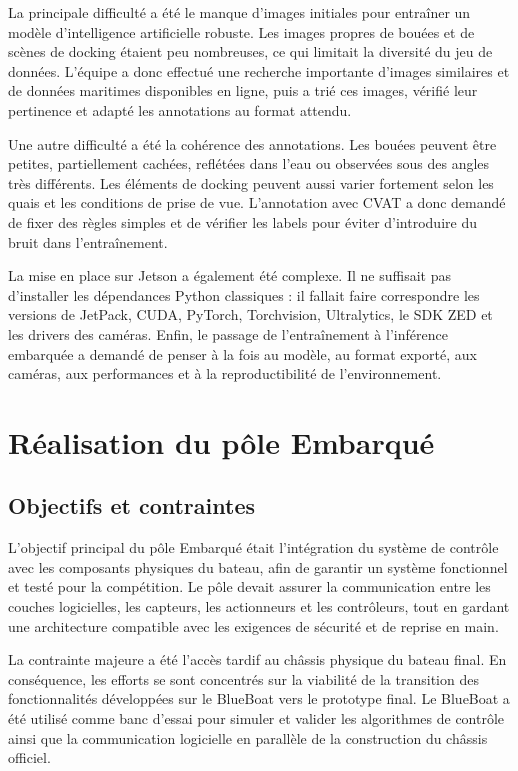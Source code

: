 \documentclass[11pt,letterpaper]{article}
\begin{document}
La principale difficulté a été le manque d'images initiales pour entraîner un modèle d'intelligence artificielle robuste. Les images propres de bouées et de scènes de docking étaient peu nombreuses, ce qui limitait la diversité du jeu de données. L'équipe a donc effectué une recherche importante d'images similaires et de données maritimes disponibles en ligne, puis a trié ces images, vérifié leur pertinence et adapté les annotations au format attendu.

Une autre difficulté a été la cohérence des annotations. Les bouées peuvent être petites, partiellement cachées, reflétées dans l'eau ou observées sous des angles très différents. Les éléments de docking peuvent aussi varier fortement selon les quais et les conditions de prise de vue. L'annotation avec CVAT a donc demandé de fixer des règles simples et de vérifier les labels pour éviter d'introduire du bruit dans l'entraînement.

La mise en place sur Jetson a également été complexe. Il ne suffisait pas d'installer les dépendances Python classiques : il fallait faire correspondre les versions de JetPack, CUDA, PyTorch, Torchvision, Ultralytics, le SDK ZED et les drivers des caméras. Enfin, le passage de l'entraînement à l'inférence embarquée a demandé de penser à la fois au modèle, au format exporté, aux caméras, aux performances et à la reproductibilité de l'environnement.

\section{Réalisation du pôle Embarqué}

\subsection{Objectifs et contraintes}

L'objectif principal du pôle Embarqué était l'intégration du système de contrôle avec les composants physiques du bateau, afin de garantir un système fonctionnel et testé pour la compétition. Le pôle devait assurer la communication entre les couches logicielles, les capteurs, les actionneurs et les contrôleurs, tout en gardant une architecture compatible avec les exigences de sécurité et de reprise en main.

La contrainte majeure a été l'accès tardif au châssis physique du bateau final. En conséquence, les efforts se sont concentrés sur la viabilité de la transition des fonctionnalités développées sur le BlueBoat vers le prototype final. Le BlueBoat a été utilisé comme banc d'essai pour simuler et valider les algorithmes de contrôle ainsi que la communication logicielle en parallèle de la construction du châssis officiel.
\end{document}
